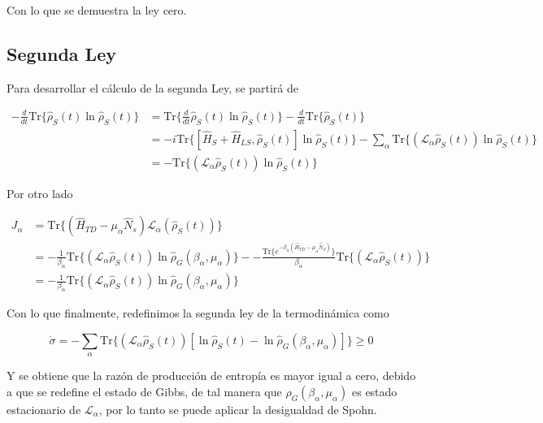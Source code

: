 \begin{appendixs}
Con lo que se demuestra la ley cero.

\newpage


\subsection{Segunda Ley}
Para desarrollar el cálculo de la segunda Ley, se partirá de

\begin{align*}
    - \frac{d}{dt}\text{Tr}\{ \hat{\rho}_{S}(t)\ln \hat{\rho}_{S}(t) \} & =  \text{Tr}\Big\{ \frac{d}{dt}\hat{\rho}_{S}(t)\ln \hat{\rho}_{S}(t) \Big\} - \frac{d}{dt}\text{Tr}\{\hat{\rho}_{S}(t) \}\\
  & = - i \text{Tr}\{[\hat{H}_{S}+\hat{H}_{LS},\hat{\rho}_{S}(t)]\ln \hat{\rho}_{S}(t)  \} - \sum_{\alpha} \text{Tr}\{(\mathcal{L}_{\alpha}\hat{\rho}_{S}(t)) \ln \hat{\rho}_{S}(t) \}  \\
  & = -\text{Tr}\{(\mathcal{L}_{\alpha}\hat{\rho}_{S}(t)) \ln \hat{\rho}_{S}(t) \}
\end{align*}

Por otro lado

\begin{align*}
    J_{\alpha} & = \text{Tr}\{ (\hat{H}_{TD} - \mu_{\alpha}\hat{N}_{s})\mathcal{L}_{\alpha}(\hat{\rho}_{S}(t)) \} \\
    & = -\frac{1}{\beta_{\alpha}} \text{Tr}\{(\mathcal{L}_{\alpha}\hat{\rho}_{S}(t)) \ln \hat{\rho}_{G}(\beta_{\alpha},\mu_{\alpha})  \} - -\frac{\text{Tr}\{e^{-\beta_{\alpha}(\hat{H}_{TD} - \mu_{\alpha}\hat{N}_{S})} \} }{\beta_{\alpha}} \text{Tr}\{(\mathcal{L}_{\alpha}\hat{\rho}_{S}(t)) \} \\
    & = -\frac{1}{\beta_{\alpha}} \text{Tr}\{(\mathcal{L}_{\alpha}\hat{\rho}_{S}(t))\ln \hat{\rho}_{G}(\beta_{\alpha},\mu_{\alpha})  \}
\end{align*}

Con lo que finalmente, redefinimos la segunda ley de la termodinámica como

\begin{equation*}
    \dot{\sigma} = - \sum_{\alpha} \text{Tr}\{(\mathcal{L}_{\alpha}\hat{\rho}_{S}(t)) [\ln \hat{\rho}_{S}(t) -\ln \hat{\rho}_{G}(\beta_{\alpha},\mu_{\alpha}) ] \} \geq 0
\end{equation*}

Y se obtiene que la razón de producción de entropía es mayor igual a cero, debido a que se redefine el estado de Gibbs, de tal manera que $\hat{\rho}_{G}(\beta_{\alpha},\mu_{\alpha})$ es estado estacionario de $\mathcal{L}_{\alpha}$, por lo tanto se puede aplicar la desigualdad de Spohn.


\end{appendixs}
